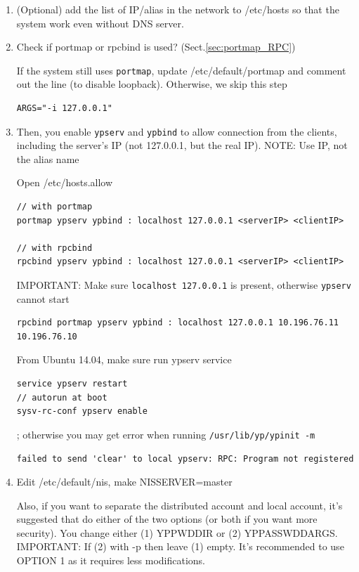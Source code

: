 \begin{enumerate}
  \item  (Optional) add the list of IP/alias in the network to /etc/hosts so
  that the system work even without DNS server. 

   \item Check if portmap or rpcbind is used? (Sect.\ref{sec:portmap_RPC})
   
   If the system still uses \verb!portmap!, update /etc/default/portmap and
   comment out the line (to disable loopback). Otherwise, we skip this step
\begin{verbatim}
ARGS="-i 127.0.0.1" 
\end{verbatim}   

  \item Then, you enable \verb!ypserv! and \verb!ypbind! to allow connection
  from the clients, including the server's IP (not 127.0.0.1, but the real IP).
  NOTE: Use IP, not the alias name 
  
Open /etc/hosts.allow  
{\small \begin{verbatim}
// with portmap
portmap ypserv ypbind : localhost 127.0.0.1 <serverIP> <clientIP>

// with rpcbind
rpcbind ypserv ypbind : localhost 127.0.0.1 <serverIP> <clientIP>
\end{verbatim}
}
IMPORTANT: Make sure \verb!localhost 127.0.0.1! is present, otherwise
\verb!ypserv! cannot start
{\small \begin{verbatim}
rpcbind portmap ypserv ypbind : localhost 127.0.0.1 10.196.76.11 10.196.76.10
\end{verbatim}
}

From Ubuntu 14.04, make sure run ypserv service
\begin{verbatim}
service ypserv restart
// autorun at boot
sysv-rc-conf ypserv enable
\end{verbatim}
; otherwise you may get error when running \verb!/usr/lib/yp/ypinit -m!
\begin{verbatim}
failed to send 'clear' to local ypserv: RPC: Program not registered
\end{verbatim}  
% 


  
   \item Edit /etc/default/nis, make NISSERVER=master
   
   Also, if you want to separate the distributed account and local account, it's
   suggested that do either of the two options (or both if you want more
   security). You change either (1) YPPWDDIR or (2) YPPASSWDDARGS.
   IMPORTANT: If (2) with -p then leave (1) empty. It's recommended to use
   OPTION 1 as it requires less modifications.
   

\end{enumerate}
